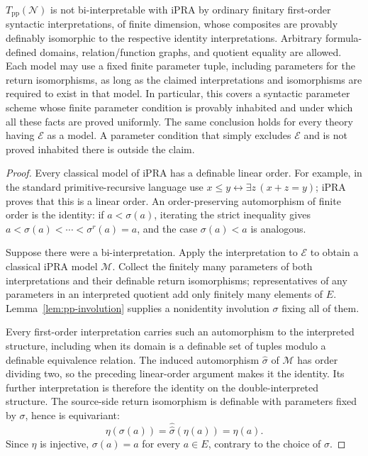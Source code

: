 \begin{theorem}
\label{thm:pp-obstruction}
$T_{\mathrm{pp}}(\mathcal N)$ is not bi-interpretable with iPRA by
ordinary finitary first-order syntactic interpretations, of finite
dimension, whose composites are provably definably isomorphic to the
respective identity interpretations.  Arbitrary formula-defined domains,
relation/function graphs, and quotient equality are allowed.  Each
model may use a fixed finite parameter tuple, including parameters for
the return isomorphisms, as long as the claimed interpretations and
isomorphisms are required to exist in that model.  In particular, this
covers a syntactic parameter scheme whose finite parameter condition is
provably inhabited and under which all these facts are proved uniformly.
The same conclusion holds for every theory having $\mathcal E$ as a
model.  A parameter condition that simply excludes $\mathcal E$ and is
not proved inhabited there is outside the claim.
\end{theorem}
\begin{proof}
Every classical model of iPRA has a definable linear order.  For example,
in the standard primitive-recursive language use
$x\le y\leftrightarrow\exists z\,(x+z=y)$; iPRA proves that this
is a linear order.  An order-preserving automorphism of finite order is
the identity: if $a<\sigma(a)$, iterating the strict inequality gives
$a<\sigma(a)<\cdots<\sigma^r(a)=a$, and the case
$\sigma(a)<a$ is analogous.

Suppose there were a bi-interpretation.  Apply the interpretation to
$\mathcal E$ to obtain a classical iPRA model $\mathcal M$.
Collect the finitely many parameters of both interpretations and their
definable return isomorphisms; representatives of any parameters in an
interpreted quotient add only finitely many elements of $E$.
Lemma~\ref{lem:pp-involution} supplies a nonidentity involution
$\sigma$ fixing all of them.

Every first-order interpretation carries such an automorphism to the
interpreted structure, including when its domain is a definable set of
tuples modulo a definable equivalence relation.  The induced
automorphism $\widehat\sigma$ of $\mathcal M$ has order dividing
two, so the preceding linear-order argument makes it the identity.
Its further interpretation is therefore the identity on the
double-interpreted structure.  The source-side return isomorphism is
definable with parameters fixed by $\sigma$, hence is equivariant:
\[
 \eta(\sigma(a))=\widehat{\widehat\sigma}(\eta(a))=\eta(a).
\]
Since $\eta$ is injective, $\sigma(a)=a$ for every $a\in E$,
contrary to the choice of $\sigma$.
\end{proof}

